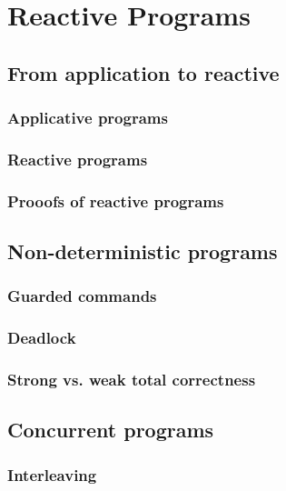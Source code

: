 \documentclass[12pt, a4paper]{book}
\begin{document}
  \section{Reactive Programs}
  \label{sec:Reactive Programs}
  \subsection{From application to reactive}
  \label{sub:From application to reactive}
  \subsubsection{Applicative programs}
  \label{subs:Applicative programs}
  \subsubsection{Reactive programs}
  \label{subs:Reactive programs}
  \subsubsection{Prooofs of reactive programs}
  \label{subs:Prooofs of reactive programs}
  \subsection{Non-deterministic programs}
  \label{sub:Non-deterministic programs}
  \subsubsection{Guarded commands}
  \label{subs:Guarded commands}
  \subsubsection{Deadlock}
  \label{subs:Deadlock}
  \subsubsection{Strong vs. weak total correctness}
  \label{subs:Strong vs. weak total correctness}
  \subsection{Concurrent programs}
  \label{sub:Concurrent programs}
  \subsubsection{Interleaving}
  \label{subs:Interleaving}
\end{document}
